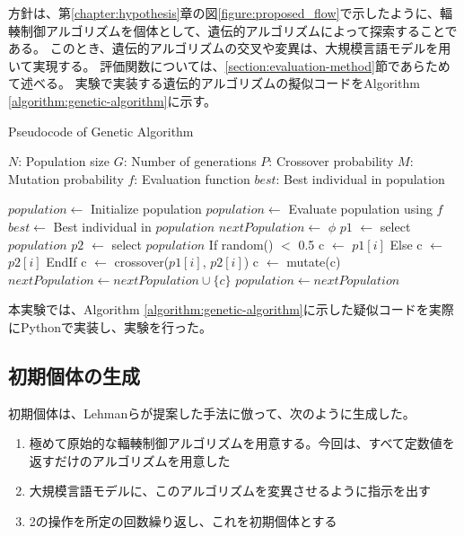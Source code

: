 \documentclass[a4paper,11pt]{jreport}
\newcommand{\figref}[1]{図\ref{#1}}
\newcommand{\chapref}[1]{第\ref{#1}章}
\newcommand{\secref}[1]{\ref{#1}節}
\newcommand{\algorithmref}[1]{Algorithm \ref{#1}}
\begin{document}
方針は、\chapref{chapter:hypothesis}の\figref{figure:proposed_flow}で示したように、輻輳制御アルゴリズムを個体として、遺伝的アルゴリズムによって探索することである。
このとき、遺伝的アルゴリズムの交叉や変異は、大規模言語モデルを用いて実現する。
評価関数については、\secref{section:evaluation-method}であらためて述べる。
実験で実装する遺伝的アルゴリズムの擬似コードを\algorithmref{algorithm:genetic-algorithm}に示す。
\begin{algorithm}[htbp]
  \caption{Pseudocode of Genetic Algorithm}
  \label{algorithm:genetic-algorithm}
  \begin{algorithmic}[1]
    \Require
      \Statex $N$: Population size
      \Statex $G$: Number of generations
      \Statex $P$: Crossover probability
      \Statex $M$: Mutation probability
      \Statex $f$: Evaluation function
    \Ensure
      \Statex $best$: Best individual in population

    \State $population \gets$ Initialize population
      \State $population \gets$ Evaluate population using $f$
      \State $best \gets$ Best individual in $population$
      \State $nextPopulation \gets$ $\phi$
      \State $p1$ $\gets$ select $population$
      \State $p2$ $\gets$ select $population$
        If {random() $<$ 0.5}
          c $\gets$ $p1[i]$
        Else
          c $\gets$ $p2[i]$
        EndIf
          c $\gets$ crossover($p1[i]$, $p2[i]$)
        \EndIf
          c $\gets$ mutate(c)
        \EndIf
        \State $nextPopulation \gets nextPopulation \cup \{c\}$
      \EndFor
      \State $population \gets nextPopulation$
    \EndFor
  \end{algorithmic}
\end{algorithm}
本実験では、\algorithmref{algorithm:genetic-algorithm}に示した疑似コードを実際にPythonで実装し、実験を行った。

\subsection{初期個体の生成}
\label{section:initialization}
初期個体は、Lehmanら\cite{lehman2022evolution}が提案した手法に倣って、次のように生成した。
\begin{enumerate}
  \item 極めて原始的な輻輳制御アルゴリズムを用意する。今回は、すべて定数値を返すだけのアルゴリズムを用意した
  \item 大規模言語モデルに、このアルゴリズムを変異させるように指示を出す
  \item 2の操作を所定の回数繰り返し、これを初期個体とする
\end{enumerate}
\end{document}
